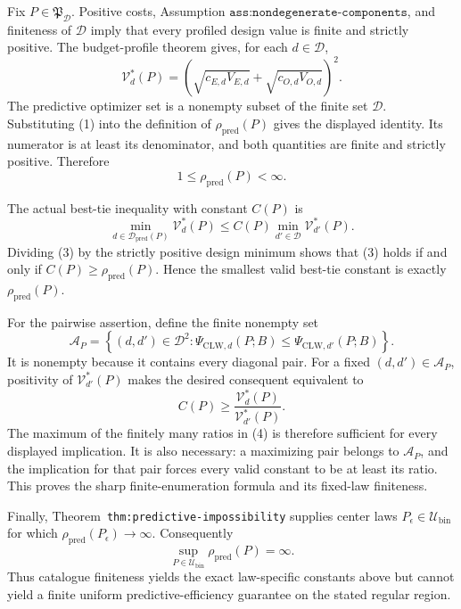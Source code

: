 Fix \(P\in\mathfrak P_{\mathcal D}\).  Positive costs, Assumption \(\texttt{ass:nondegenerate-components}\), and finiteness of \(\mathcal D\) imply that every profiled design value is finite and strictly positive.  The budget-profile theorem gives, for each \(d\in\mathcal D\),
\[
 \mathcal V_d^*(P)
 =\left(\sqrt{c_{E,d}V_{E,d}}+
 \sqrt{c_{O,d}V_{O,d}}\right)^2. \tag{1}
\]
The predictive optimizer set is a nonempty subset of the finite set \(\mathcal D\).  Substituting (1) into the definition of \(\rho_{\mathrm{pred}}(P)\) gives the displayed identity.  Its numerator is at least its denominator, and both quantities are finite and strictly positive.  Therefore
\[
 1\le\rho_{\mathrm{pred}}(P)<\infty. \tag{2}
\]

The actual best-tie inequality with constant \(C(P)\) is
\[
 \min_{d\in\mathcal D_{\mathrm{pred}}(P)}\mathcal V_d^*(P)
 \le C(P)\min_{d'\in\mathcal D}\mathcal V_{d'}^*(P). \tag{3}
\]
Dividing (3) by the strictly positive design minimum shows that (3) holds if and only if \(C(P)\ge\rho_{\mathrm{pred}}(P)\).  Hence the smallest valid best-tie constant is exactly \(\rho_{\mathrm{pred}}(P)\).

For the pairwise assertion, define the finite nonempty set
\[
 \mathcal A_P=\left\{(d,d')\in\mathcal D^2:
 \Psi_{\mathrm{CLW},d}(P;B)
 \le\Psi_{\mathrm{CLW},d'}(P;B)\right\}.
\]
It is nonempty because it contains every diagonal pair.  For a fixed \((d,d')\in\mathcal A_P\), positivity of \(\mathcal V_{d'}^*(P)\) makes the desired consequent equivalent to
\[
 C(P)\ge\frac{\mathcal V_d^*(P)}{\mathcal V_{d'}^*(P)}. \tag{4}
\]
The maximum of the finitely many ratios in (4) is therefore sufficient for every displayed implication.  It is also necessary: a maximizing pair belongs to \(\mathcal A_P\), and the implication for that pair forces every valid constant to be at least its ratio.  This proves the sharp finite-enumeration formula and its fixed-law finiteness.

Finally, Theorem~\texttt{thm:predictive-impossibility} supplies center laws \(P_\epsilon\in\mathcal U_{\mathrm{bin}}\) for which \(\rho_{\mathrm{pred}}(P_\epsilon)\to\infty\).  Consequently
\[
 \sup_{P\in\mathcal U_{\mathrm{bin}}}\rho_{\mathrm{pred}}(P)=\infty.
\]
Thus catalogue finiteness yields the exact law-specific constants above but cannot yield a finite uniform predictive-efficiency guarantee on the stated regular region.